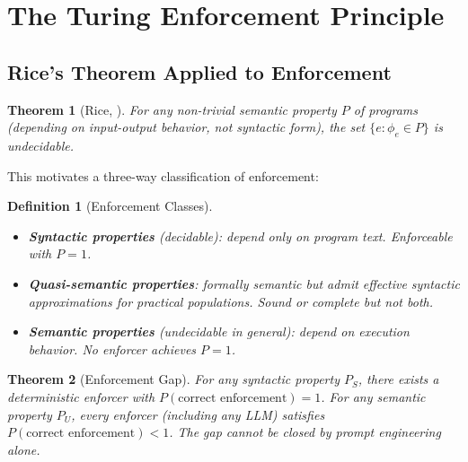 \documentclass[11pt, a4paper, logo, copyright]{googledeepmind}
\newtheorem{definition}{Definition}[section]
\newtheorem{theorem}{Theorem}[section]
\begin{document}
\section{The Turing Enforcement Principle}
\label{sec:turing}

\subsection{Rice's Theorem Applied to Enforcement}

\begin{theorem}[Rice, \citeyear{rice1953}]
For any non-trivial semantic property $P$ of programs (depending on input-output behavior, not syntactic form), the set $\{e : \phi_e \in P\}$ is undecidable.
\end{theorem}

This motivates a three-way classification of enforcement:

\begin{definition}[Enforcement Classes]
~
\begin{itemize}
\item \textbf{Syntactic properties} (decidable): depend only on program text. Enforceable with $P = 1$.
\item \textbf{Quasi-semantic properties}: formally semantic but admit effective syntactic approximations for practical populations. Sound or complete but not both.
\item \textbf{Semantic properties} (undecidable in general): depend on execution behavior. No enforcer achieves $P = 1$.
\end{itemize}
\end{definition}

\begin{theorem}[Enforcement Gap]
\label{thm:gap}
For any syntactic property $P_S$, there exists a deterministic enforcer with $P(\text{correct enforcement}) = 1$. For any semantic property $P_U$, every enforcer (including any LLM) satisfies $P(\text{correct enforcement}) < 1$. The gap cannot be closed by prompt engineering alone.
\end{theorem}
\end{document}
